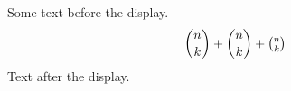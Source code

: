\documentclass[12pt]{article}
\begin{document}
Some text before the display.
\[ \binom{n}{k} + \dbinom{n}{k} + \tbinom{n}{k} \]
Text after the display.
\end{document}
